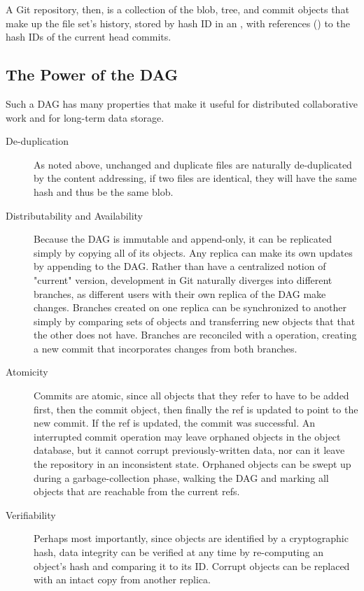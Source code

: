 A Git repository, then, is a collection of the blob, tree, and commit objects
that make up the file set's history, stored by hash ID in an , with references () to the hash IDs of the current head
commits\cite{git_initial_readme}.

%

\subsection{The Power of the DAG}

Such a DAG has many properties that make it useful for distributed collaborative
work and for long-term data storage.

\begin{description}

    \item[De-duplication] As noted above, unchanged and duplicate files are
        naturally de-duplicated by the content addressing, if two files are
        identical, they will have the same hash and thus be the same blob.

    \item[Distributability and Availability] Because the DAG is immutable and
        append-only, it can be replicated simply by copying all of its objects.
        Any replica can make its own updates by appending to the DAG. Rather
        than have a centralized notion of "current" version, development in Git
        naturally diverges into different branches, as different users with
        their own replica of the DAG make changes. Branches created on one
        replica can be synchronized to another simply by comparing sets of
        objects and transferring new objects that that the other does not have.
        Branches are reconciled with a  operation, creating a new
        commit that incorporates changes from both branches.

    \item[Atomicity] Commits are atomic, since all objects that they refer to
        have to be added first, then the commit object, then finally the ref is
        updated to point to the new commit. If the ref is updated, the commit
        was successful. An interrupted commit operation may leave orphaned
        objects in the object database, but it cannot corrupt previously-written
        data, nor can it leave the repository in an inconsistent state. Orphaned
        objects can be swept up during a garbage-collection phase, walking the
        DAG and marking all objects that are reachable from the current refs.

    \item[Verifiability] Perhaps most importantly, since objects are identified
        by a cryptographic hash, data integrity can be verified at any time by
        re-computing an object's hash and comparing it to its ID. Corrupt
        objects can be replaced with an intact copy from another replica.

\end{description}

